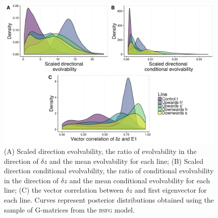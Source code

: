 \begin{refsection}
\begin{figure}
\centering
\includegraphics[width = 12cm]{chapter_ratones/media/SI/figureS10_Fig4Gversion.png}
\caption[Directional evolutionary statistics in the G-matrix]{(A) Scaled direction evolvability, the ratio of evolvability in the direction of $\delta z$ and the mean evolvability for each line; (B) Scaled direction conditional evolvability, the ratio of conditional evolvability in the direction of $\delta z$ and the mean conditional evolvability for each line; (C) the vector correlation between $\delta z$ and first eigenvector for each line. Curves represent posterior distributions obtained using the sample of G-matrices from the \textsc{bsfg} model.}
\label{figsup:direcmatstatG}
\end{figure}

\end{refsection}
